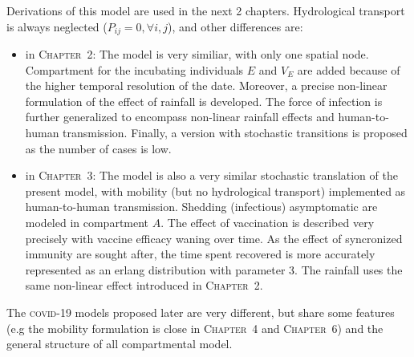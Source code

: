 Derivations of this model are used in the next 2 chapters. Hydrological transport is always neglected ($P_{ij}=0, \forall i,j$), and other differences are:
\begin{itemize}
	\item in \textsc{Chapter~2}: The model is very similiar, with only one spatial node. Compartment for the incubating individuals $E$ and $V_E$ are added because of the higher temporal resolution of the date. Moreover, a precise non-linear formulation of the effect of rainfall is developed. The force of infection is further generalized to encompass non-linear rainfall effects and human-to-human transmission. Finally, a version with stochastic transitions is proposed as the number of cases is low.
	\item in \textsc{Chapter~3}: The model is also a very similar stochastic translation of the present model, with mobility (but no hydrological transport) implemented as human-to-human transmission. Shedding (infectious) asymptomatic are modeled in compartment $A$. The effect of vaccination is described very precisely with vaccine efficacy waning over time. As the effect of syncronized immunity are sought after,  the time spent recovered is more accurately represented as an erlang distribution with parameter 3. The rainfall uses the same non-linear effect introduced in \textsc{Chapter~2}. 
\end{itemize}
The \textsc{covid}-19 models proposed later are very different, but share some features (e.g the mobility formulation is close in \textsc{Chapter~4} and \textsc{Chapter~6}) and the general structure of all compartmental model.
